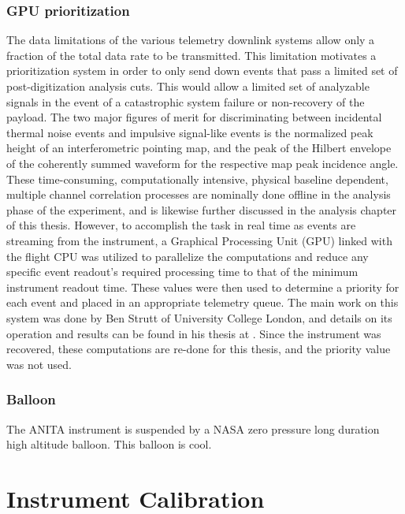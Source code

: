	\subsection{GPU prioritization}
		The data limitations of the various telemetry downlink systems allow only a fraction of the total data rate to be transmitted.  This limitation motivates a prioritization system in order to only send down events that pass a limited set of post-digitization analysis cuts.  This would allow a limited set of analyzable signals in the event of a catastrophic system failure or non-recovery of the payload.  The two major figures of merit for discriminating between incidental thermal noise events and impulsive signal-like events is the normalized peak height of an interferometric pointing map, and the peak of the Hilbert envelope of the coherently summed waveform for the respective map peak incidence angle.  These time-consuming, computationally intensive, physical baseline dependent, multiple channel correlation processes are nominally done offline in the analysis phase of the experiment, and is likewise further discussed in the analysis chapter of this thesis.  However, to accomplish the task in real time as events are streaming from the instrument, a Graphical Processing Unit (GPU) linked with the flight CPU was utilized to parallelize the computations and reduce any specific event readout's required processing time to that of the minimum instrument readout time.  These values were then used to determine a priority for each event and placed in an appropriate telemetry queue.  The main work on this system was done by Ben Strutt of University College London, and details on its operation and results can be found in his thesis at \cite{BenSThesis}.  Since the instrument was recovered, these computations are re-done for this thesis, and the priority value was not used.
		
	\subsection{Balloon}
		The ANITA instrument is suspended by a NASA zero pressure long duration high altitude balloon.  This balloon is cool.
			
			
			
			
\chapter{Instrument Calibration}


